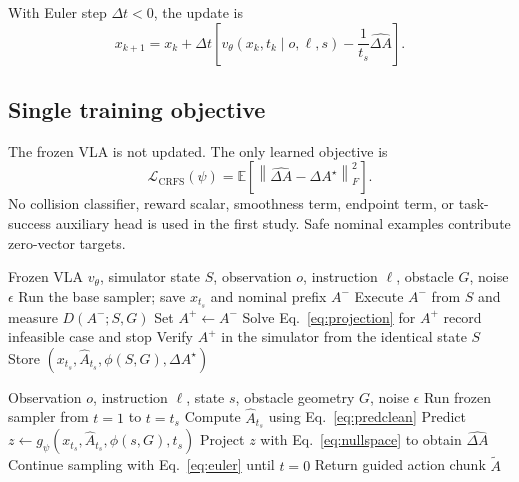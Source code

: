 \documentclass[10pt,conference]{IEEEtran}
\newcommand{\E}{\mathbb{E}}
\newcommand{\1}{\mathbf{1}}
\newcommand{\norm}[1]{\left\lVert #1 \right\rVert}
\begin{document}
With Euler step $\Delta t<0$, the update is
\begin{equation}
    x_{k+1}=x_k+\Delta t\left[
    v_\theta(x_k,t_k\mid o,\ell,s)
    -\frac{1}{t_s}\widehat{\Delta A}
    \right].
    \label{eq:euler}
\end{equation}

\subsection{Single training objective}

The frozen VLA is not updated. The only learned objective is
\begin{equation}
    \boxed{
    \mathcal{L}_{\mathrm{CRFS}}(\psi)
    =\E\left[
    \norm{\widehat{\Delta A}-\Delta A^\star}_F^2
    \right].}
    \label{eq:loss}
\end{equation}
No collision classifier, reward scalar, smoothness term, endpoint term, or task-success auxiliary head is used in the first study. Safe nominal examples contribute zero-vector targets.

\begin{algorithm}[t]
\caption{Offline counterfactual dataset construction}
\label{alg:data}
\begin{algorithmic}[1]
\Require Frozen VLA $v_\theta$, simulator state $S$, observation $o$, instruction $\ell$, obstacle $G$, noise $\epsilon$
\State Run the base sampler; save $x_{t_s}$ and nominal prefix $A^-$
\State Execute $A^-$ from $S$ and measure $D(A^-;S,G)$
    \State Set $A^+\gets A^-$
\Else
    \State Solve Eq.~\eqref{eq:projection} for $A^+$
     \State record infeasible case and stop \EndIf
    \State Verify $A^+$ in the simulator from the identical state $S$
\EndIf
\State Store $(x_{t_s},\widehat A_{t_s},\phi(S,G),\Delta A^\star)$
\end{algorithmic}
\end{algorithm}

\begin{algorithm}[t]
\caption{Learned steering at inference}
\label{alg:inference}
\begin{algorithmic}[1]
\Require Observation $o$, instruction $\ell$, state $s$, obstacle geometry $G$, noise $\epsilon$
\State Run frozen sampler from $t=1$ to $t=t_s$
\State Compute $\widehat A_{t_s}$ using Eq.~\eqref{eq:predclean}
\State Predict $z\gets g_\psi(x_{t_s},\widehat A_{t_s},\phi(s,G),t_s)$
\State Project $z$ with Eq.~\eqref{eq:nullspace} to obtain $\widehat{\Delta A}$
\State Continue sampling with Eq.~\eqref{eq:euler} until $t=0$
\State Return guided action chunk $\widetilde A$
\end{algorithmic}
\end{algorithm}
\end{document}
